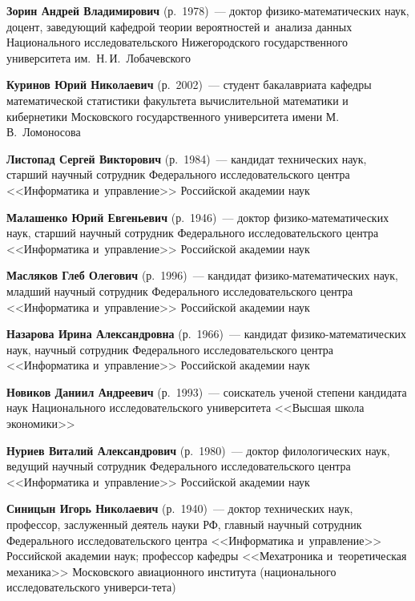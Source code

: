\begin{multicols}{2}
\noindent 
\textbf{Зорин Андрей Владимирович} (р.\ 1978)~--- доктор фи\-зи\-ко-ма\-те\-ма\-ти\-че\-ских наук,
доцент, заведующий ка\-фед\-рой тео\-рии вероятностей и~анализа данных 
Национального исследовательского Нижегородского государственного университета им.\ Н.\,И.~Лобачевского


\noindent
\textbf{Куринов Юрий Николаевич} (р.\ 2002)~--- студент бакалавриата ка\-фед\-ры математической статистики факультета вы\-чис\-ли\-тель\-ной математики и кибернетики
Московского государственного университета имени М.\,В.~Ломоносова

\noindent
\textbf{Листопад Сергей Викторович} (р.\ 1984)~--- 
кандидат технических наук, старший научный сотрудник Федерального исследовательского цент\-ра <<Информатика и~управ\-ле\-ние>> Российской академии наук

\noindent
\textbf{Малашенко Юрий Евгеньевич} (р.\ 1946)~--- доктор фи\-зи\-ко-ма\-те\-ма\-ти\-че\-ских наук, 
старший научный сотрудник Федерального исследовательского цент\-ра <<Информатика и~управ\-ле\-ние>> Российской академии наук

\noindent
\textbf{Масляков Глеб Олегович} (р.\ 1996)~--- кандидат фи\-зи\-ко-ма\-те\-ма\-ти\-че\-ских наук,
 младший научный сотрудник Федерального исследовательского цент\-ра <<Информатика и~управ\-ле\-ние>> Российской академии наук

\noindent
\textbf{Назарова Ирина Александровна} (р.\ 1966)~--- кандидат фи\-зи\-ко-ма\-те\-ма\-ти\-че\-ских наук, 
научный сотрудник Федерального исследовательского цент\-ра <<Информатика и~управ\-ле\-ние>> Российской академии наук

\noindent
\textbf{Новиков Даниил Андреевич} (р.\ 1993)~--- соискатель ученой степени кандидата наук Национального исследовательского университета 
<<Высшая школа экономики>>

\noindent
\textbf{Нуриев Виталий Александрович} (р.\ 1980)~--- 
доктор филологических наук, ведущий научный сотрудник Федерального исследовательского центра <<Информатика и~управ\-ле\-ние>>
 Российской академии наук

    
\noindent
\textbf{Синицын Игорь Николаевич} (р.\ 1940)~--- доктор технических наук, профессор, заслуженный деятель науки РФ,
главный научный сотрудник Федерального исследовательского цент\-ра <<Информатика и~управ\-ле\-ние>> Российской академии наук;
профессор кафедры <<Мехатроника и~теоретическая механика>> Московского авиационного института (национального исследовательского универси-\linebreak тета)




\end{multicols}
